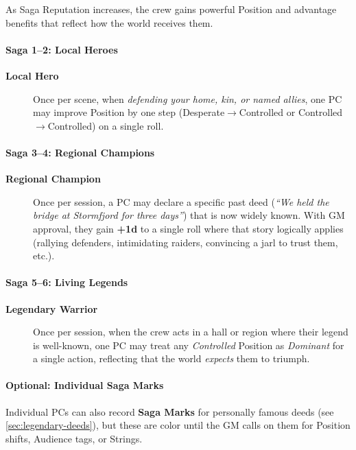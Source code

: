 \documentclass[11pt]{article}
\begin{document}
As Saga Reputation increases, the crew gains powerful Position and advantage benefits that reflect
how the world receives them.

\paragraph*{Saga 1--2: Local Heroes}
\begin{description}
  \item[\textbf{Local Hero}] Once per scene, when \emph{defending your home, kin, or named allies},
    one PC may improve Position by one step (Desperate$\to$Controlled or Controlled$\to$Controlled) on a
    single roll.
\end{description}

\paragraph*{Saga 3--4: Regional Champions}
\begin{description}
  \item[\textbf{Regional Champion}] Once per session, a PC may declare a specific past deed
    (\emph{``We held the bridge at Stormfjord for three days''}) that is now widely known. With GM
    approval, they gain \textbf{+1d} to a single roll where that story logically applies (rallying
    defenders, intimidating raiders, convincing a jarl to trust them, etc.).
\end{description}

\paragraph*{Saga 5--6: Living Legends}
\begin{description}
  \item[\textbf{Legendary Warrior}] Once per session, when the crew acts in a hall or region where
    their legend is well-known, one PC may treat any \emph{Controlled} Position as \emph{Dominant}
    for a single action, reflecting that the world \emph{expects} them to triumph.
\end{description}

\paragraph*{Optional: Individual Saga Marks}
Individual PCs can also record \textbf{Saga Marks} for personally famous deeds (see
\ref{sec:legendary-deeds}), but these are color until the GM calls on them for Position shifts,
Audience tags, or Strings.
\end{document}
